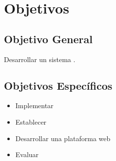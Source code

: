 \newpage
\section{Objetivos}
\subsection{Objetivo General}
Desarrollar un sistema .

\subsection{Objetivos Específicos}
 
\begin{itemize}
    \item Implementar
    \item Establecer 
    
    \item Desarrollar una plataforma web 
    \item Evaluar 
\end{itemize}